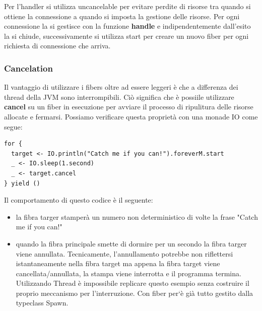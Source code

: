Per l’handler si utilizza uncancelable per evitare perdite di risorse tra quando si ottiene la connessione a quando si imposta la gestione delle risorse. Per ogni connessione
la si gestisce con la funzione \textbf{handle} e indipendentemente dall’esito la si chiude, successivamente si utilizza start per creare un nuovo fiber per ogni richiesta di connessione che arriva.

\subsubsection{Cancelation}
Il vantaggio di utilizzare i fibers oltre ad essere leggeri è che a differenza dei thread della JVM sono interrompibili. Ciò significa che è possiile utilizzare \textbf{cancel} su un fiber in esecuzione per avviare il processo di ripulitura delle risorse allocate e fermarsi. Possiamo verificare questa proprietà con una monade IO come segue:
\begin{verbatim}
for {
  target <- IO.println("Catch me if you can!").foreverM.start
  _ <- IO.sleep(1.second)
  _ <- target.cancel
} yield ()
\end{verbatim}

Il comportamento di questo codice è il seguente: 
\begin{itemize}
    \item la fibra targer stamperà un numero non deterministico di volte la frase "Catch me if you can!"
    \item quando la fibra principale smette di dormire per un secondo la fibra targer viene annullata. Tecnicamente, l'annullamento potrebbe non riflettersi istantaneamente nella fibra target ma appena la fibra target viene cancellata/annullata, la stampa viene interrotta e il programma termina. Utilizzando Thread è impossibile replicare questo esempio senza costruire il proprio meccanismo per l’interruzione. Con fiber per`è  già tutto gestito dalla typeclass Spawn.

\end{itemize}

